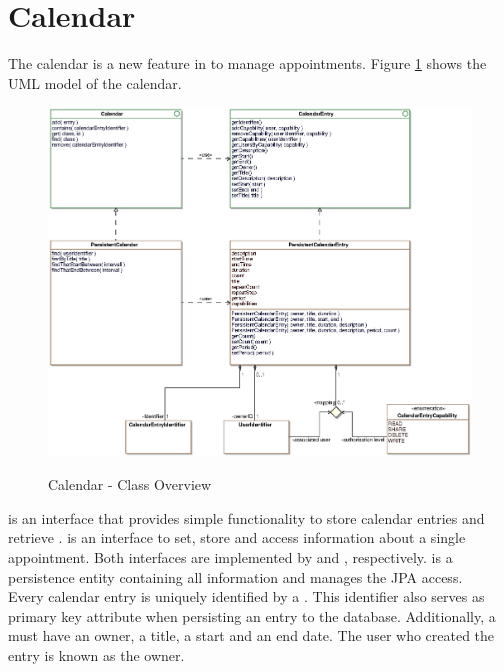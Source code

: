 \newpage
\section{Calendar}

The calendar is a new feature in \salespoint{} to manage appointments.
Figure \ref{calendar_overview} shows the UML model of the calendar.

\begin{figure}[ht]
	\centering
  \includegraphics[width=1.0\textwidth]{images/Calendar_Overview.eps}
	\label{calendar_overview}
	\caption{Calendar - Class Overview}
\end{figure}

 is an interface that provides simple functionality to store calendar entries and retrieve .
 is an interface to set, store and access information about a single appointment.
Both interfaces are implemented by  and , respectively.
 is a persistence entity containing all information and  manages the JPA access.
\\

Every calendar entry is uniquely identified by a .
This identifier also serves as primary key attribute when persisting an entry to the database.
Additionally, a  must have an owner, a title, a start and an end date.
The user who created the entry is known as the owner.
\\

